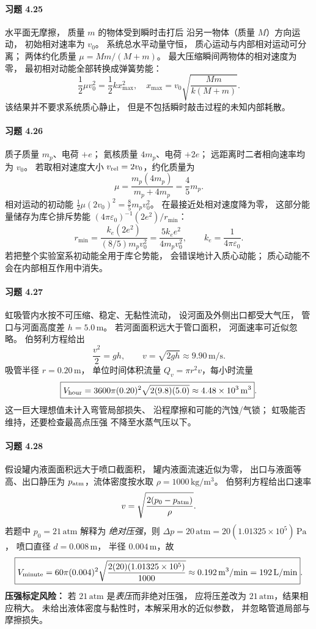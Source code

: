 \paragraph{习题 4.25}
水平面无摩擦，
质量 \(m\) 的物体受到瞬时击打后
沿另一物体（质量 \(M\)）方向运动，
初始相对速率为 \(v_0\)。
系统总水平动量守恒，
质心运动与内部相对运动可分离；
两体约化质量
\(\mu=Mm/(M+m)\)。
最大压缩瞬间两物体的相对速度为零，
最初相对动能全部转换成弹簧势能：
\[
 \frac12\mu v_0^2=\frac12k x_{\max}^2,
 \quad
 \boxed{x_{\max}=v_0\sqrt{\frac{Mm}{k(M+m)}}}.
\]
该结果并不要求系统质心静止，
但是不包括瞬时敲击过程的未知内部耗散。

\paragraph{习题 4.26}
质子质量 \(m_p\)、电荷 \(+e\)；
氦核质量 \(4m_p\)、电荷 \(+2e\)；
远距离时二者相向速率均为 \(v_0\)。
若取相对速度大小
\(v_{\rm rel}=2v_0\)，约化质量为
\[
 \mu=\frac{m_p(4m_p)}{m_p+4m_p}
 =\frac45m_p.
\]
相对运动的初动能
\(\frac12\mu(2v_0)^2
 =\frac85m_pv_0^2\)。
在最接近处相对速度降为零，
这部分能量储存为库仑排斥势能
\((4\pi\varepsilon_0)^{-1}(2e^2)/r_{\min}\)：
\[
 \boxed{r_{\min}=
 \frac{k_e(2e^2)}{(8/5)m_pv_0^2}
 =\frac{5k_ee^2}{4m_pv_0^2}},
 \qquad k_e=\frac1{4\pi\varepsilon_0}.
\]
若把整个实验室系初动能全用于库仑势能，
会错误地计入质心动能；
质心动能不会在内部相互作用中消失。

\paragraph{习题 4.27}
虹吸管内水按不可压缩、稳定、无黏性流动，
设河面及外侧出口都受大气压，
管口与河面高度差
\(h=5.0\,\mathrm m\)。
若河面面积远大于管口面积，
河面速率可近似忽略。
伯努利方程给出
\[
 \frac{v^2}{2}=gh,\qquad
 v=\sqrt{2gh}\approx9.90\,\mathrm{m/s}.
\]
吸管半径 \(r=0.20\,\mathrm m\)，
单位时间体积流量
\(Q_v=\pi r^2v\)，每小时流量
\[
 \boxed{V_{\rm hour}
 =3600\pi(0.20)^2\sqrt{2(9.8)(5.0)}
 \approx4.48\times10^3\,\mathrm{m^3}}.
\]
这一巨大理想值未计入弯管局部损失、
沿程摩擦和可能的汽蚀/气锁；
虹吸能否维持，还要检查最高点压强
不降至水蒸气压以下。

\paragraph{习题 4.28}
假设罐内液面面积远大于喷口截面积，
罐内液面流速近似为零，
出口与液面等高、出口静压为
\(p_{\rm atm}\)，流体密度按水取
\(\rho=1000\,\mathrm{kg/m^3}\)。
伯努利方程给出口速率
\[
 v=\sqrt{\frac{2(p_0-p_{\rm atm})}{\rho}}.
\]
若题中 \(p_0=21\,\mathrm{atm}\) 解释为
\emph{绝对压强}，则
\(\Delta p=20\,\mathrm{atm}=20(1.01325\times10^5)\,\mathrm{Pa}\)，
喷口直径 \(d=0.008\,\mathrm m\)，
半径 \(0.004\,\mathrm m\)，故
\[
 \boxed{V_{\rm minute}
 =60\pi(0.004)^2
 \sqrt{\frac{2(20)(1.01325\times10^5)}{1000}}
 \approx0.192\,\mathrm{m^3/min}
 =192\,\mathrm{L/min}}.
\]
\textbf{压强标定风险：}
若 \(21\,\mathrm{atm}\) 是\emph{表压}而非绝对压强，
应将压差改为 \(21\,\mathrm{atm}\)，结果相应稍大。
未给出液体密度与黏性时，本解采用水的近似参数，
并忽略管道局部与摩擦损失。

